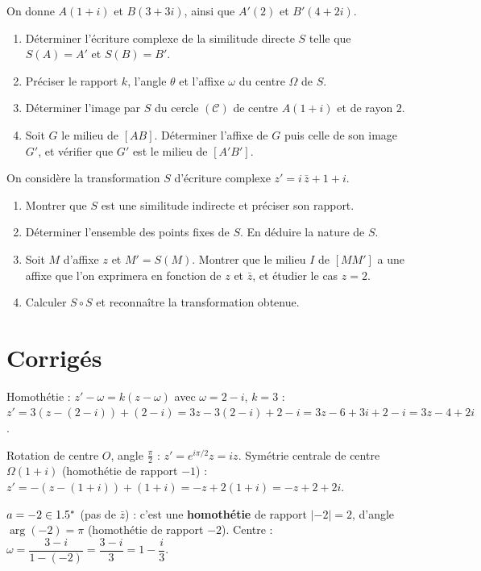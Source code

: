 On donne $A(1+i)$ et $B(3+3i)$, ainsi que $A'(2)$ et $B'(4+2i)$.
\begin{enumerate}[label=\arabic*)]
\item Déterminer l'écriture complexe de la similitude directe $S$ telle que $S(A)=A'$ et $S(B)=B'$.
\item Préciser le rapport $k$, l'angle $\theta$ et l'affixe $\omega$ du centre $\Omega$ de $S$.
\item Déterminer l'image par $S$ du cercle $(\mathcal C)$ de centre $A(1+i)$ et de rayon $2$.
\item Soit $G$ le milieu de $[AB]$. Déterminer l'affixe de $G$ puis celle de son image $G'$, et vérifier
que $G'$ est le milieu de $[A'B']$.
\end{enumerate}

On considère la transformation $S$ d'écriture complexe $z'=i\,\bar z+1+i$.
\begin{enumerate}[label=\arabic*)]
\item Montrer que $S$ est une similitude indirecte et préciser son rapport.
\item Déterminer l'ensemble des points fixes de $S$. En déduire la nature de $S$.
\item Soit $M$ d'affixe $z$ et $M'=S(M)$. Montrer que le milieu $I$ de $[MM']$ a une affixe que l'on
exprimera en fonction de $z$ et $\bar z$, et étudier le cas $z=2$.
\item Calculer $S\circ S$ et reconnaître la transformation obtenue.
\end{enumerate}

\section{Corrigés}

Homothétie : $z'-\omega=k(z-\omega)$ avec $\omega=2-i$, $k=3$ :
$z'=3(z-(2-i))+(2-i)=3z-3(2-i)+2-i=3z-6+3i+2-i=3z-4+2i$.

Rotation de centre $O$, angle $\frac\pi2$ : $z'=e^{i\pi/2}z=iz$. Symétrie centrale de centre $\Omega(1+i)$
(homothétie de rapport $-1$) : $z'=-(z-(1+i))+(1+i)=-z+2(1+i)=-z+2+2i$.

$a=-2\in1.5^*$ (pas de $\bar z$) : c'est une \textbf{homothétie} de rapport $|-2|=2$, d'angle $\arg(-2)=\pi$
(homothétie de rapport $-2$). Centre : $\omega=\dfrac{3-i}{1-(-2)}=\dfrac{3-i}{3}=1-\dfrac i3$.

